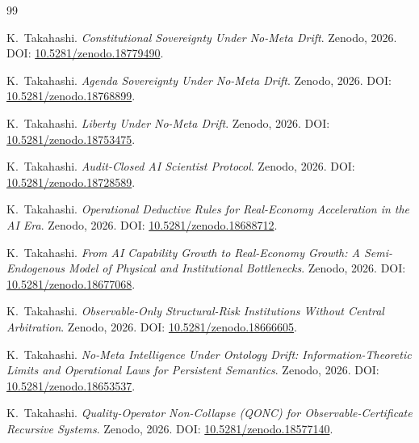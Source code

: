 \documentclass[11pt,a4paper]{article}
\theoremstyle{definition}
\theoremstyle{remark}
\begin{document}
\begin{thebibliography}{99}

K.~Takahashi.
\newblock \emph{Constitutional Sovereignty Under No-Meta Drift}.
\newblock Zenodo, 2026.
\newblock DOI: \href{https://doi.org/10.5281/zenodo.18779490}{10.5281/zenodo.18779490}.

K.~Takahashi.
\newblock \emph{Agenda Sovereignty Under No-Meta Drift}.
\newblock Zenodo, 2026.
\newblock DOI: \href{https://doi.org/10.5281/zenodo.18768899}{10.5281/zenodo.18768899}.

K.~Takahashi.
\newblock \emph{Liberty Under No-Meta Drift}.
\newblock Zenodo, 2026.
\newblock DOI: \href{https://doi.org/10.5281/zenodo.18753475}{10.5281/zenodo.18753475}.

K.~Takahashi.
\newblock \emph{Audit-Closed AI Scientist Protocol}.
\newblock Zenodo, 2026.
\newblock DOI: \href{https://doi.org/10.5281/zenodo.18728589}{10.5281/zenodo.18728589}.

K.~Takahashi.
\newblock \emph{Operational Deductive Rules for Real-Economy Acceleration in the AI Era}.
\newblock Zenodo, 2026.
\newblock DOI: \href{https://doi.org/10.5281/zenodo.18688712}{10.5281/zenodo.18688712}.

K.~Takahashi.
\newblock \emph{From AI Capability Growth to Real-Economy Growth: A Semi-Endogenous Model of Physical and Institutional Bottlenecks}.
\newblock Zenodo, 2026.
\newblock DOI: \href{https://doi.org/10.5281/zenodo.18677068}{10.5281/zenodo.18677068}.

K.~Takahashi.
\newblock \emph{Observable-Only Structural-Risk Institutions Without Central Arbitration}.
\newblock Zenodo, 2026.
\newblock DOI: \href{https://doi.org/10.5281/zenodo.18666605}{10.5281/zenodo.18666605}.

K.~Takahashi.
\newblock \emph{No-Meta Intelligence Under Ontology Drift: Information-Theoretic Limits and Operational Laws for Persistent Semantics}.
\newblock Zenodo, 2026.
\newblock DOI: \href{https://doi.org/10.5281/zenodo.18653537}{10.5281/zenodo.18653537}.

K.~Takahashi.
\newblock \emph{Quality-Operator Non-Collapse (QONC) for Observable-Certificate Recursive Systems}.
\newblock Zenodo, 2026.
\newblock DOI: \href{https://doi.org/10.5281/zenodo.18577140}{10.5281/zenodo.18577140}.


\end{thebibliography}
\end{document}
